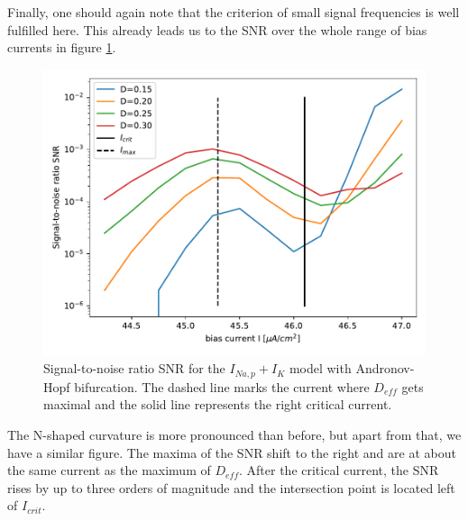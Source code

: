 \documentclass[12pt,a4paper]{article}
\begin{document}
Finally, one should again note that the criterion of small signal frequencies is well fulfilled here. This already leads us to the SNR over the whole range of bias currents in figure \ref{specanhopf}.
\begin{figure}[H]
	\centering
	\includegraphics[scale=0.95]{snranhopfcrit2max.pdf}\caption{Signal-to-noise ratio SNR for the $I_{Na,p}+I_K$ model with Andronov-Hopf bifurcation. The dashed line marks the current where $D_{eff}$ gets maximal and the solid line represents the right critical current.}
	\label{specanhopf}
\end{figure}
The N-shaped curvature is more pronounced than before, but apart from that, we have a similar figure. The maxima of the SNR shift to the right and are at about the same current as the maximum of $D_{eff}$. After the critical current, the SNR rises by up to three orders of magnitude and the intersection point is located left of $I_{crit}$. 
\end{document}
